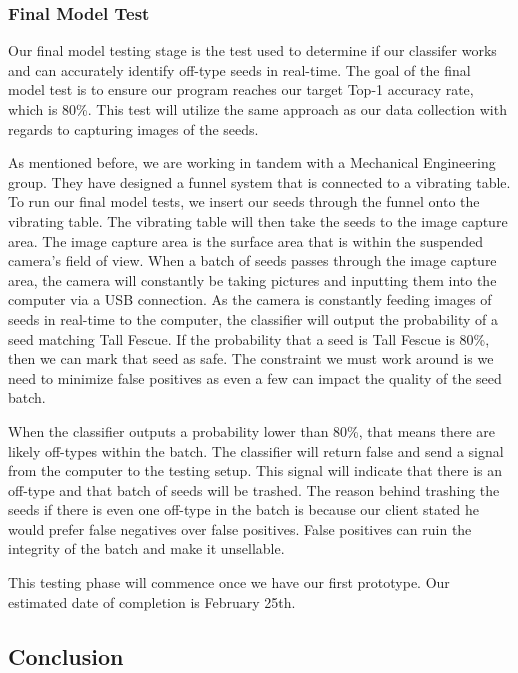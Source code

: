 \documentclass[onecolumn, draftclsnofoot,10pt, compsoc]{IEEEtran}
\begin{document}
\subsubsection{Final Model Test}

Our final model testing stage is the test used to determine if our classifer works and can accurately identify off-type seeds in real-time. The goal of the final model test is to ensure our program reaches our target Top-1 accuracy rate, which is 80\%. This test will utilize the same approach as our data collection with regards to capturing images of the seeds.

As mentioned before, we are working in tandem with a Mechanical Engineering group. They have designed a funnel system that is connected to a vibrating table. To run our final model tests, we insert our seeds through the funnel onto the vibrating table. The vibrating table will then take the seeds to the image capture area. The image capture area is the surface area that is within the suspended camera's field of view. When a batch of seeds passes through the image capture area, the camera will constantly be taking pictures and inputting them into the computer via a USB connection. As the camera is constantly feeding images of seeds in real-time to the computer, the classifier will output the probability of a seed matching Tall Fescue. If the probability that a seed is Tall Fescue is 80\%, then we can mark that seed as safe. The constraint we must work around is we need to minimize false positives as even a few can impact the quality of the seed batch. 

When the classifier outputs a probability lower than 80\%, that means there are likely off-types within the batch. The classifier will return false and send a signal from the computer to the testing setup. This signal will indicate that there is an off-type and that batch of seeds will be trashed. The reason behind trashing the seeds if there is even one off-type in the batch is because our client stated he would prefer false negatives over false positives. False positives can ruin the integrity of the batch and make it unsellable. 

This testing phase will commence once we have our first prototype. Our estimated date of completion is February 25th. 

\subsection{Conclusion}
\end{document}
